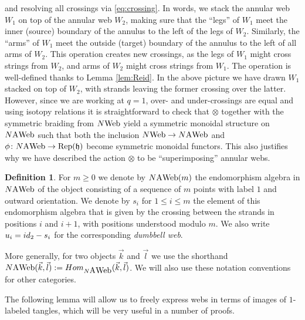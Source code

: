\documentclass[11pt]{article}
\theoremstyle{definition}
\newtheorem{defi}[theo]{Definition}
\numberwithin{equation}{section}
\newcommand{\Hom}{{\rm Hom}}
\newcommand{\id}{{\rm id}}
\newcommand{\reph}{\Rep(\h)}
\def\h{{\mathfrak h}}
\newcommand{\Rep}{\cat{Rep}}
\newcommand{\cat}[1]{\ensuremath{\mbox{\bfseries {\upshape {#1}}}}}
\newcommand{\Web}[1][]{#1\cat{Web}}
\newcommand{\AWeb}[1][]{#1\cat{A}\cat{Web}}
\begin{document}
and resolving all crossings via \eqref{eq:crossing}. In words, we stack the
annular web $W_1$ on top of the annular web $W_2$, making sure that the ``legs'' of $W_1$
meet the inner (source) boundary of the annulus to the left of the legs of
$W_2$. Similarly, the ``arms'' of $W_1$ meet the outside (target) boundary of
the annulus to the left of all arms of $W_2$. This operation creates new
crossings, as the legs of $W_1$ might cross strings from $W_2$, and arms of
$W_2$ might cross strings from $W_1$. The operation is well-defined thanks to
Lemma \ref{lem:Reid}. In the above picture we have drawn $W_1$ stacked on top of
$W_2$, with strands leaving the former crossing over the latter. However, since
we are working at $q=1$, over- and under-crossings are equal and using isotopy
relations it is straightforward to check that $\otimes$ together with the
symmetric braiding from $\Web[N]$ yield a symmetric monoidal structure on
$\AWeb[N]$ such that both the inclusion $\Web[N]\to \AWeb[N]$ and $\phi \colon
\AWeb[N] \to \reph$ become symmetric monoidal functors. This also justifies why
we have described the action $\otimes$ to be ``superimposing'' annular webs. 

\begin{defi} \label{def:si} For $m\geq 0$ we denote by $\AWeb[N](m)$ the
endomorphism algebra in $\AWeb[N]$ of the object consisting of a sequence of $m$
points with label $1$ and outward orientation. We denote by $s_i$ for $1\leq i
\leq m$ the element of this endomorphism algebra that is given by the crossing
between the strands in positions $i$ and $i+1$, with positions understood modulo
$m$. We also write $u_i=\id_2-s_i$ for the corresponding \textit{dumbbell web}.

More generally, for two objects $\vec{k}$ and $\vec{l}$ we use the shorthand $\AWeb[N](\vec{k},\vec{l}):= \Hom_{\AWeb[N]}(\vec{k},\vec{l})$. We will also use these notation conventions for other categories. 
\end{defi}

The following lemma will allow us to freely express webs in terms of images of $1$-labeled tangles, which will be very useful in a number of proofs. 
\end{document}
